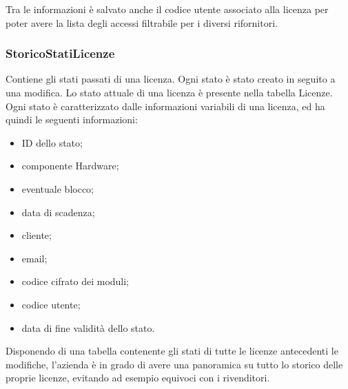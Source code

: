 Tra le informazioni è salvato anche il codice utente associato alla licenza per poter avere la lista degli accessi filtrabile per i diversi rifornitori.

\subsubsection{StoricoStatiLicenze}

Contiene gli stati passati di una licenza. Ogni stato è stato creato in seguito a una modifica. Lo stato attuale di una licenza è presente nella tabella Licenze.
\\Ogni stato è caratterizzato dalle informazioni variabili di una licenza, ed ha quindi le seguenti informazioni:

\begin{itemize}
\item ID dello stato;
\item componente Hardware;
\item eventuale blocco;
\item data di scadenza;
\item cliente;
\item email;
\item codice cifrato dei moduli;
\item codice utente;
\item data di fine validità dello stato.
\end{itemize}

Disponendo di una tabella contenente gli stati di tutte le licenze antecedenti le modifiche, l'azienda è in grado di avere una panoramica su tutto lo storico delle proprie licenze, evitando ad esempio equivoci con i rivenditori.